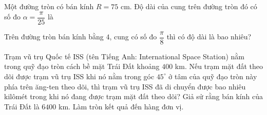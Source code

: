 \begin{bt}%
	Một đường tròn có bán kính $R=75$ cm. Độ dài của cung trên đường tròn đó có số đo $\alpha =\dfrac{\pi}{25}$ là 
\end{bt}

\begin{bt}%
	Trên đường tròn bán kính bằng $4$, cung có số đo $\dfrac{\pi}{8}$ thì có độ dài là bao nhiêu? 
\end{bt}

\begin{bt}%
	Trạm vũ trụ Quốc tế ISS (tên Tiếng Anh: International Space Station) nằm trong quỹ đạo tròn cách bề mặt Trái Đất khoảng $400$ km. Nếu trạm mặt đất theo dõi được trạm vũ trụ ISS khi nó nằm trong góc $45^\circ$ ở tâm của quỹ đạo tròn này phía trên ăng-ten theo dõi, thì trạm vũ trụ ISS đã di chuyển được bao nhiêu kilômét trong khi nó đang được trạm mặt đất theo dõi? Giả sử rằng bán kính của Trái Đất là $6400$ km. Làm tròn kết quả đến hàng đơn vị. 
\end{bt}

